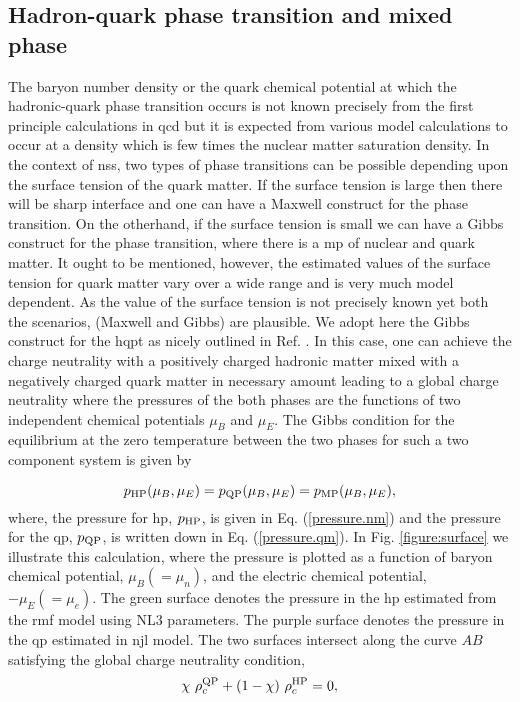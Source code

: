 \documentclass[a4paper, 11pt]{article}
\begin{document}
\subsection{Hadron-quark phase transition and mixed phase} \label{hadronic-quark.phase.transition.and.mixed.phase}
The baryon number density or the quark chemical potential at which the hadronic-quark phase transition occurs is not known precisely from the first principle calculations in \ac{qcd} but it is expected from various model calculations to occur at a density which is few times the nuclear matter saturation density. In the context of \ac{ns}s, two types of phase transitions can be possible depending upon the surface tension \cite{Alford:2001, Voskresensky:2002, Palhares:2010, Pinto:2012, Mintz:2012, Lugones:2013, Yasutake:2014} of the quark matter. If the surface tension is large then there will be sharp interface and one can have a Maxwell construct for the phase transition. On the otherhand, if the surface tension is small we can have a Gibbs construct for the phase transition, where there is a \ac{mp} of nuclear and quark matter. It ought to be mentioned, however, the estimated values of the surface tension for quark matter vary over a wide range and is very much model dependent. As the value of the surface tension is not precisely known yet both the scenarios, (Maxwell and Gibbs) are plausible. We adopt here the Gibbs construct for the \ac{hqpt} as nicely outlined in Ref. \cite{Schertler:1999}. In this case, one can achieve the charge neutrality with a positively charged hadronic matter mixed with a negatively charged quark matter in necessary amount leading to a global charge neutrality where the pressures of the both phases are the functions of two independent chemical potentials $\mu_B$ and $\mu_E$. The Gibbs condition for the equilibrium at the zero temperature between the two phases for such a two component system is given by \cite{Glendenning:1992}

\begin{equation} \label{gibbs.condition}
p_{\rm{HP}}(\mu_B,\mu_E) = p_{\rm{QP}}(\mu_B,\mu_E) = p_{\rm{MP}}(\mu_B,\mu_E),
\end{equation}
where, the pressure for \ac{hp}, $p_{\rm HP}$, is given in Eq. (\ref{pressure.nm}) and the pressure for the \ac{qp}, $p_{\rm QP}$, is written down in Eq. (\ref{pressure.qm}).  In Fig. \ref{figure:surface} we illustrate this calculation, where the pressure is plotted as a function of baryon chemical potential, $\mu_B(=\mu_n)$, and the electric chemical potential, $-\mu_E(=\mu_e)$. The green surface denotes the pressure in the \ac{hp} estimated from the \ac{rmf} model using NL3 parameters. The purple surface denotes the pressure in the \ac{qp} estimated in \ac{njl} model. The two surfaces intersect along the curve $AB$ satisfying the global charge neutrality condition,
\begin{eqnarray} \label{global.charge.neutrality}
\chi~\rho_c^{\rm QP} + (1-\chi)~\rho_c^{\rm HP} = 0,
\end{eqnarray}
\end{document}
